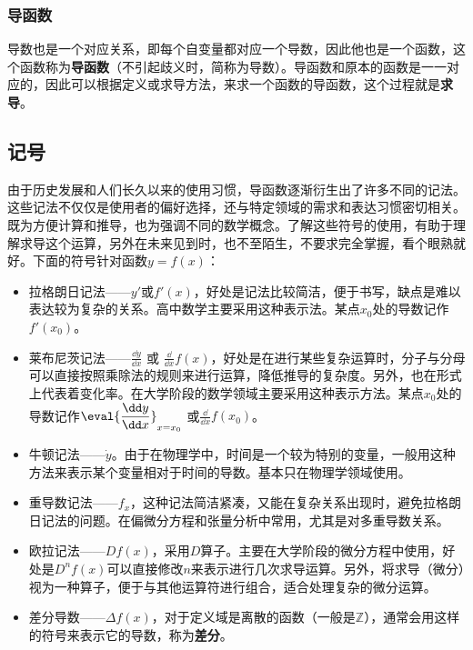 \subsubsection{导函数}

导数也是一个对应关系，即每个自变量都对应一个导数，因此他也是一个函数，这个函数称为\textbf{导函数}（不引起歧义时，简称为导数）。导函数和原本的函数是一一对应的，因此可以根据定义或求导方法，来求一个函数的导函数，这个过程就是\textbf{求导}。

\subsection{记号}
由于历史发展和人们长久以来的使用习惯，导函数逐渐衍生出了许多不同的记法。这些记法不仅仅是使用者的偏好选择，还与特定领域的需求和表达习惯密切相关。既为方便计算和推导，也为强调不同的数学概念。了解这些符号的使用，有助于理解求导这个运算，另外在未来见到时，也不至陌生，不要求完全掌握，看个眼熟就好。下面的符号针对函数$y=f(x)$：
\begin{itemize}
\item 拉格朗日记法——$y'$或$f'(x)$，好处是记法比较简洁，便于书写，缺点是难以表达较为复杂的关系。高中数学主要采用这种表示法。某点$x_0$处的导数记作$f'(x_0)$。
\item 莱布尼茨记法——$\displaystyle\frac{\dd y}{\dd x}$  或  $\displaystyle\frac{\dd}{\dd x}f(x)$，好处是在进行某些复杂运算时，分子与分母可以直接按照乘除法的规则来进行运算，降低推导的复杂度。另外，也在形式上代表着变化率。在大学阶段的数学领域主要采用这种表示方法。某点$x_0$处的导数记作$\displaystyle\eval{\dfrac{\dd y}{\dd x}}_{x=x_0}$ 或$\displaystyle\frac{\dd}{\dd x}f(x_0)$。
\item 牛顿记法——$\dot{y}$。由于在物理学中，时间是一个较为特别的变量，一般用这种方法来表示某个变量相对于时间的导数。基本只在物理学领域使用。
\item 重导数记法——$f_x$，这种记法简洁紧凑，又能在复杂关系出现时，避免拉格朗日记法的问题。在偏微分方程和张量分析中常用，尤其是对多重导数关系。
\item 欧拉记法——$Df(x)$，采用$D$算子。主要在大学阶段的微分方程中使用，好处是$D^n f(x)$可以直接修改$n$来表示进行几次求导运算。另外，将求导（微分）视为一种算子，便于与其他运算符进行组合，适合处理复杂的微分运算。
\item 差分导数——$\Delta f(x)$，对于定义域是离散的函数（一般是$\mathbb{Z}$），通常会用这样的符号来表示它的导数，称为\textbf{差分}。
\end{itemize}

